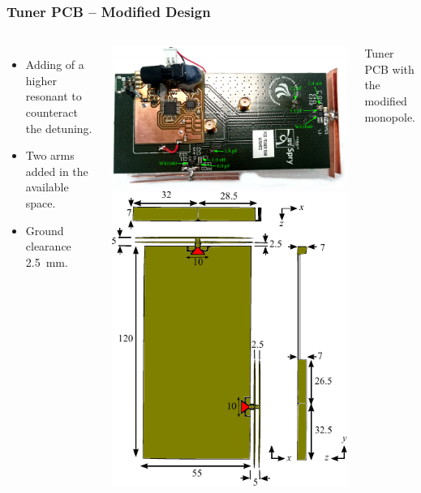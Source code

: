 \begin{frame}[fragile]
    \frametitle{Tuner PCB -- Modified Design}
    \begin{columns}[onlytextwidth,t]
          \begin{itemize}
          \item Adding of a higher resonant to counteract the detuning.
          \item Two arms added in the available space. 
          \item Ground clearance \SI{2.5}{mm}.
          \end{itemize}
        \begin{center}
            \includegraphics[scale=0.33, angle =90]{img/Lasse/lassedouble.pdf}
            \includegraphics[scale=0.53]{img/Lasse/3d_drawing_modi.pdf}
        \end{center}
        Tuner PCB with the modified monopole.
    \end{columns}
\end{frame}


